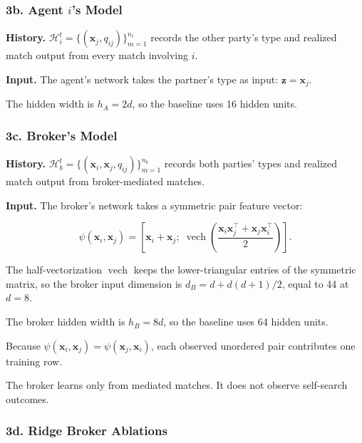 \documentclass[11pt]{article}
\begin{document}
\subsubsection{\texorpdfstring{3b. Agent \(i\)'s Model}{3b. Agent i's Model}}\label{b.-agent-is-model}

\textbf{History.} \(\mathcal{H}_i^t = \{(\mathbf{x}_j, q_{ij})\}_{m=1}^{n_i}\) records the other party's type and realized match output from every match involving \(i\).

\textbf{Input.} The agent's network takes the partner's type as input: \(\mathbf{z} = \mathbf{x}_j\).

The hidden width is \(h_A = 2d\), so the baseline uses 16 hidden units.

\subsubsection{3c. Broker's Model}\label{c.-brokers-model}

\textbf{History.} \(\mathcal{H}_b^t = \{(\mathbf{x}_i, \mathbf{x}_j, q_{ij})\}_{m=1}^{n_b}\) records both parties' types and realized match output from broker-mediated matches.

\textbf{Input.} The broker's network takes a symmetric pair feature vector:

\[
\psi(\mathbf{x}_i,\mathbf{x}_j)
= \left[
\mathbf{x}_i+\mathbf{x}_j;\;
\operatorname{vech}\!\left(\frac{\mathbf{x}_i\mathbf{x}_j^\top+\mathbf{x}_j\mathbf{x}_i^\top}{2}\right)
\right].
\]

The half-vectorization \(\operatorname{vech}\) keeps the lower-triangular entries of the symmetric matrix, so the broker input dimension is \(d_B = d + d(d+1)/2\), equal to 44 at \(d = 8\).

The broker hidden width is \(h_B = 8d\), so the baseline uses 64 hidden units.

Because \(\psi(\mathbf{x}_i,\mathbf{x}_j)=\psi(\mathbf{x}_j,\mathbf{x}_i)\), each observed unordered pair contributes one training row.

The broker learns only from mediated matches. It does not observe self-search outcomes.

\subsubsection{3d. Ridge Broker Ablations}\label{d.-ridge-broker-ablations}
\end{document}
